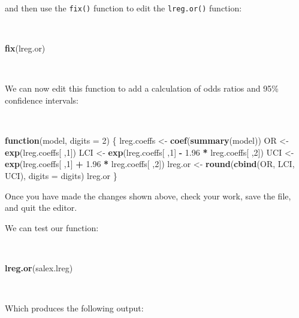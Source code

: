 \documentclass[12pt,a4paper]{book}
\newenvironment{Shaded}{\begin{snugshade}}{\end{snugshade}}
\newcommand{\ControlFlowTok}[1]{\textcolor[rgb]{0.13,0.29,0.53}{\textbf{#1}}}
\newcommand{\DataTypeTok}[1]{\textcolor[rgb]{0.13,0.29,0.53}{#1}}
\newcommand{\DecValTok}[1]{\textcolor[rgb]{0.00,0.00,0.81}{#1}}
\newcommand{\FloatTok}[1]{\textcolor[rgb]{0.00,0.00,0.81}{#1}}
\newcommand{\KeywordTok}[1]{\textcolor[rgb]{0.13,0.29,0.53}{\textbf{#1}}}
\newcommand{\NormalTok}[1]{#1}
\newcommand{\OperatorTok}[1]{\textcolor[rgb]{0.81,0.36,0.00}{\textbf{#1}}}
\newcommand{\StringTok}[1]{\textcolor[rgb]{0.31,0.60,0.02}{#1}}
\theoremstyle{definition}
\theoremstyle{definition}
\theoremstyle{definition}
\theoremstyle{remark}
\begin{document}
and then use the \texttt{fix()} function to edit the \texttt{lreg.or()}
function:

~

\begin{Shaded}
\begin{Highlighting}[]
\KeywordTok{fix}\NormalTok{(lreg.or)}
\end{Highlighting}
\end{Shaded}

~

We can now edit this function to add a calculation of odds ratios and
95\% confidence intervals:

~

\begin{Shaded}
\begin{Highlighting}[]
\ControlFlowTok{function}\NormalTok{(model, }\DataTypeTok{digits =} \DecValTok{2}\NormalTok{) \{}
\NormalTok{  lreg.coeffs <-}\StringTok{ }\KeywordTok{coef}\NormalTok{(}\KeywordTok{summary}\NormalTok{(model))}
\NormalTok{  OR <-}\StringTok{ }\KeywordTok{exp}\NormalTok{(lreg.coeffs[ ,}\DecValTok{1}\NormalTok{])}
\NormalTok{  LCI <-}\StringTok{ }\KeywordTok{exp}\NormalTok{(lreg.coeffs[ ,}\DecValTok{1}\NormalTok{] }\OperatorTok{-}\StringTok{ }\FloatTok{1.96} \OperatorTok{*}\StringTok{ }\NormalTok{lreg.coeffs[ ,}\DecValTok{2}\NormalTok{])}
\NormalTok{  UCI <-}\StringTok{ }\KeywordTok{exp}\NormalTok{(lreg.coeffs[ ,}\DecValTok{1}\NormalTok{] }\OperatorTok{+}\StringTok{ }\FloatTok{1.96} \OperatorTok{*}\StringTok{ }\NormalTok{lreg.coeffs[ ,}\DecValTok{2}\NormalTok{])}
\NormalTok{  lreg.or <-}\StringTok{ }\KeywordTok{round}\NormalTok{(}\KeywordTok{cbind}\NormalTok{(OR, LCI, UCI), }\DataTypeTok{digits =}\NormalTok{ digits)}
\NormalTok{  lreg.or}
\NormalTok{\}}
\end{Highlighting}
\end{Shaded}

\newpage

Once you have made the changes shown above, check your work, save the
file, and quit the editor.

We can test our function:

~

\begin{Shaded}
\begin{Highlighting}[]
\KeywordTok{lreg.or}\NormalTok{(salex.lreg)}
\end{Highlighting}
\end{Shaded}

~

Which produces the following output:
\end{document}
